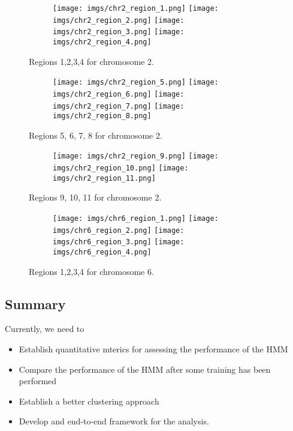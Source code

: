 \begin{figure}[h]
	\begin{subfigure}{}
		\texttt{[image: imgs/chr2\_region\_1.png]}
		\texttt{[image: imgs/chr2\_region\_2.png]}
		\texttt{[image: imgs/chr2\_region\_3.png]}
		\texttt{[image: imgs/chr2\_region\_4.png]}
	\end{subfigure}
	\caption{Regions 1,2,3,4  for chromosome 2.}
	\label{fig:image4}
\end{figure}

\begin{figure}[h]
	\begin{subfigure}{}
		\texttt{[image: imgs/chr2\_region\_5.png]}
		\texttt{[image: imgs/chr2\_region\_6.png]}
		\texttt{[image: imgs/chr2\_region\_7.png]}
		\texttt{[image: imgs/chr2\_region\_8.png]}
	\end{subfigure}
	\caption{Regions 5, 6, 7, 8  for chromosome 2.}
	\label{fig:image5}
\end{figure}

\begin{figure}[h]
	\begin{subfigure}{}
		\texttt{[image: imgs/chr2\_region\_9.png]}
		\texttt{[image: imgs/chr2\_region\_10.png]}
		\texttt{[image: imgs/chr2\_region\_11.png]}
	\end{subfigure}
	\caption{Regions 9, 10, 11  for chromosome 2.}
	\label{fig:image6}
\end{figure}

\begin{figure}[h]
	
	\begin{subfigure}{}
		\texttt{[image: imgs/chr6\_region\_1.png]}
		\texttt{[image: imgs/chr6\_region\_2.png]}
		\texttt{[image: imgs/chr6\_region\_3.png]}
		\texttt{[image: imgs/chr6\_region\_4.png]}
	\end{subfigure}
	
	\caption{Regions 1,2,3,4  for chromosome 6.  }
	\label{fig:image7}
\end{figure}


\subsection{Summary}

Currently, we need to

\begin{itemize}
	\item Establish quantitative mterics for assessing the performance of the HMM
	\item Compare the performance of the HMM after some training has been performed
	\item Establish a better clustering approach
	\item Develop and end-to-end framework for the analysis.
\end{itemize}